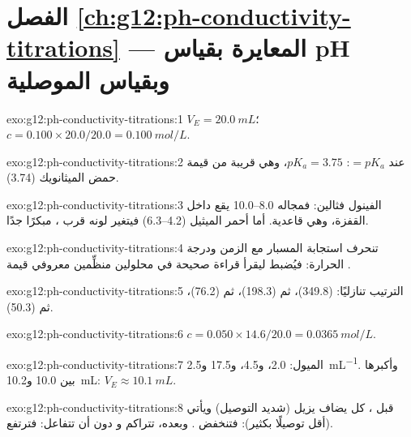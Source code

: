 \section*{الفصل \ref{ch:g12:ph-conductivity-titrations} --- المعايرة بقياس pH وبقياس الموصلية}

\begin{solution}{exo:g12:ph-conductivity-titrations:1}
$V_E = \qty{20.0}{mL}$؛ $c = 0.100 \times 20.0 / 20.0 = \qty{0.100}{mol/L}$.
\end{solution}

\begin{solution}{exo:g12:ph-conductivity-titrations:2}
عند   $= pK_a$: $pK_a = 3.75$، وهي قريبة من قيمة حمض الميثانويك
(3.74).
\end{solution}

\begin{solution}{exo:g12:ph-conductivity-titrations:3}
الفينول فثالين: فمجاله 8.0--10.0 يقع داخل القفزة، وهي قاعدية.
أما أحمر الميثيل (4.2--6.3) فيتغير لونه قرب ، مبكرًا جدًا.
\end{solution}

\begin{solution}{exo:g12:ph-conductivity-titrations:4}
تنحرف استجابة المسبار مع الزمن ودرجة الحرارة: فيُضبط ليقرأ
قراءة صحيحة في محلولين منظِّمين معروفي قيمة .
\end{solution}

\begin{solution}{exo:g12:ph-conductivity-titrations:5}
الترتيب تنازليًا:  (349.8)، ثم  (198.3)، ثم  (76.2)، ثم  (50.3).
\end{solution}

\begin{solution}{exo:g12:ph-conductivity-titrations:6}
$c = 0.050 \times 14.6 / 20.0 = \qty{0.0365}{mol/L}$.
\end{solution}

\begin{solution}{exo:g12:ph-conductivity-titrations:7}
الميول: 2.0، و4.5، و17.5 و\qty{2.5}{mL^{-1}}. وأكبرها بين
10.0 و\qty{10.2}{mL}: $V_E \approx \qty{10.1}{mL}$.
\end{solution}

\begin{solution}{exo:g12:ph-conductivity-titrations:8}
قبل ، كل   يضاف يزيل   (شديد
التوصيل) ويأتي   (أقل توصيلًا بكثير): فتنخفض
. وبعده، تتراكم   و دون أن
تتفاعل: فترتفع.
\end{solution}

